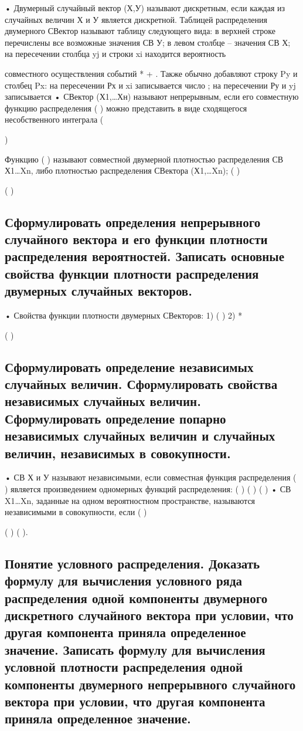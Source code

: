 • Двумерный случайный вектор (Х,У) называют дискретным, если каждая из случайных величин Х и У является дискретной.
Таблицей распределения двумерного СВектор называют таблицу следующего вида:
в верхней строке перечислены все возможные значения
СВ У; в левом столбце – значения
СВ Х;
на пересечении столбца yj и строки xi находится вероятность {
	
} совместного осуществления событий *
+ {
}.
Также обычно добавляют строку Py и столбец Px:
на пересечении Рх и xi записывается число ; на пересечении Ру и yj записывается
• СВектор (Х1,…Хн) называют непрерывным, если его совместную функцию распределения
(
) можно представить в виде
сходящегося несобственного интеграла (

)





Функцию (
) называют совместной двумерной плотностью распределения СВ Х1…Xn, либо плотностью распределения СВектора
(Х1,…Xn); (
)

( )



\subsection{Сформулировать определения непрерывного случайного вектора и его функции плотности распределения вероятностей. Записать основные свойства функции плотности распределения двумерных случайных векторов.}

• Свойства функции плотности двумерных СВекторов:
1) ( )
2) *

( ) 

\subsection{Сформулировать определение независимых случайных величин. Сформулировать свойства независимых случайных величин. Сформулировать определение попарно независимых случайных величин и случайных величин, независимых в совокупности.}

• СВ Х и У называют независимыми, если совместная функция распределения ( ) является произведением одномерных функций
распределения: ( )
( )
( )
• СВ X1…Xn, заданные на одном вероятностном пространстве, называются независимыми в совокупности, если
(
)


( )
( ).

\subsection{Понятие условного распределения. Доказать формулу для вычисления условного ряда распределения одной компоненты двумерного дискретного случайного вектора при условии, что другая компонента приняла определенное значение. Записать формулу для вычисления условной плотности распределения одной компоненты двумерного непрерывного случайного вектора при условии, что другая компонента приняла определенное значение.}


